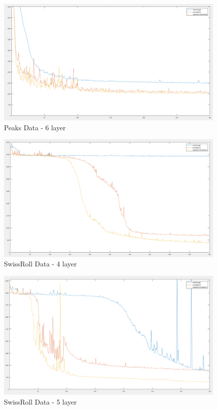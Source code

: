\documentclass{article}
\numberwithin{equation}{section}
\begin{document}
\begin{figure}[h!]
  \caption{Peaks Data - 6 layer}
  \includegraphics[width=\textwidth]{rej_m_peaks_6layers.png}
\end{figure}

\begin{figure}[h!]
  \caption{SwissRoll Data - 4 layer}
  \includegraphics[width=\textwidth]{rej_m_swissroll_4layers.png}
\end{figure}

\begin{figure}[h!]
  \caption{SwissRoll Data - 5 layer}
  \includegraphics[width=\textwidth]{rej_m_swissroll_5layers.png}
\end{figure}
\end{document}

